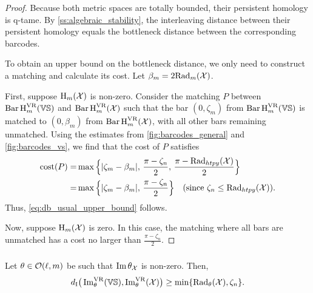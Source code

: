\begin{proof}
    Because both metric spaces are totally bounded, their persistent homology is q-tame.
    By \cref{ss:algebraic_stability}, the interleaving distance between their persistent homology equals the bottleneck distance between the corresponding barcodes.

    To obtain an upper bound on the bottleneck distance, we only need to construct a matching and calculate its cost. Let \( \beta_m = 2\firstdeath{m}{\cX} \).

    First, suppose \( \opH_m(\cX) \) is non-zero.
    Consider the matching \( P \) between \( \Hbarc[\field]{m}{\VS} \) and \( \Hbarc[\field]{m}{\cX} \) such that the bar \( (0, \zeta_m) \) from \( \Hbarc[\field]{m}{\VS} \) is matched to \( (0, \beta_m) \) from \( \Hbarc[\field]{m}{\cX} \), with all other bars remaining unmatched. Using the estimates from \cref{fig:barcodes_general} and \cref{fig:barcodes_vs}, we find that the cost of \( P \) satisfies
    \begin{align*}
        \cost(P)
        = & \max\Big\{|\zeta_m - \beta_m|,\, \frac{\pi - \zeta_n}{2},\, \frac{\pi - \Rad_{htpy}(\cX)}{2}\Big\} \\
        = & \max\Big\{|\zeta_m - \beta_m|,\, \frac{\pi - \zeta_n}{2}\Big\} \quad \text{(since \( \zeta_n \leq \Rad_{htpy}(\cX) \))}.
    \end{align*}
    Thus, \cref{eq:db_usual_upper_bound} follows.

    Now, suppose \( \opH_m(\cX) \) is zero. In this case, the matching where all bars are unmatched has a cost no larger than \( \frac{\pi - \zeta_n}{2}\).
\end{proof}

\subsubsection{}\label{sss:db_theta_lower_bound}

\medskip\lemma
Let $\theta \in \cO(\ell, m)$ be such that $\img \theta_\cX$ is non-zero.
Then,
\begin{equation}\label{eq:db_theta_lower_bound}
	\di\big(\img^{\VR}_{\theta}(\VS), \img^{\VR}_{\theta}(\cX)\big)
	\geq \min\{\firstdeath{\theta}{\cX}, \zeta_n\}. %
\end{equation}

